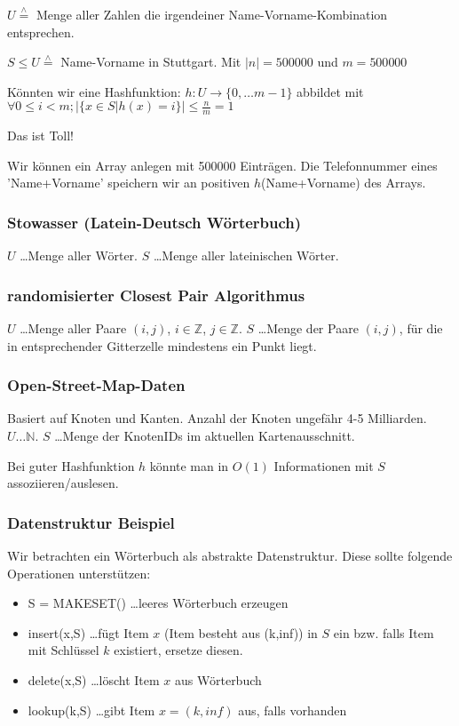 $U \overset{\wedge}{=}$ Menge aller Zahlen die irgendeiner Name-Vorname-Kombination entsprechen.\par\medskip

$S \leq U \overset{\wedge}{=}$ Name-Vorname in Stuttgart. Mit $|n| = 500000$ und $m = 500 000$\par\medskip

Könnten wir eine Hashfunktion: $h:U \rightarrow \{ 0,\dots m-1 \}$ abbildet mit $\forall 0 \leq i < m ; \big| \{ x\in S | h(x)=i \} \big| \leq \frac{n}{m} = 1$ \par\medskip %

Das ist Toll!\par\medskip

Wir können ein Array anlegen mit 500000 Einträgen. Die Telefonnummer eines 'Name+Vorname' speichern wir an positiven $h$(Name+Vorname) des Arrays.\par\medskip

\subsubsection{Stowasser (Latein-Deutsch Wörterbuch)}
$U$ \dots Menge aller Wörter. $S$ \dots Menge aller lateinischen Wörter.

\subsubsection{randomisierter Closest Pair Algorithmus}
$U$ \dots Menge aller Paare $(i,j)$, $i \in \mathbb{Z}$, $j \in \mathbb{Z}$. $S$ \dots Menge der Paare $(i,j)$, für die in entsprechender Gitterzelle mindestens ein Punkt liegt.

\subsubsection{Open-Street-Map-Daten}
Basiert auf Knoten und Kanten. Anzahl der Knoten ungefähr 4-5 Milliarden. $U \dots \mathbb{N}$. $S$ \dots Menge der KnotenIDs im aktuellen Kartenausschnitt.

\par\medskip Bei guter Hashfunktion $h$ könnte man in $O(1)$ Informationen mit $S$ assoziieren/auslesen.

\subsubsection{Datenstruktur Beispiel}
Wir betrachten ein Wörterbuch als abstrakte Datenstruktur. Diese sollte folgende Operationen unterstützen:
\begin{itemize}
	\item[] S = MAKESET() \dots leeres Wörterbuch erzeugen
	\item[] insert(x,S) \dots fügt Item $x$ (Item besteht aus (k,inf)) in $S$ ein bzw. falls Item mit Schlüssel $k$ existiert, ersetze diesen.
	\item[] delete(x,S) \dots löscht Item $x$ aus Wörterbuch
	\item[] lookup(k,S) \dots gibt Item $x = (k,inf)$ aus, falls vorhanden
\end{itemize}



